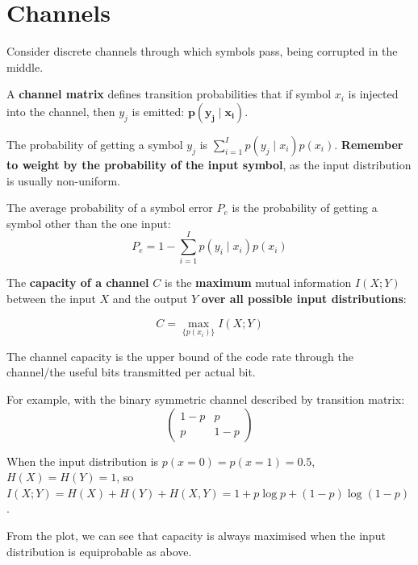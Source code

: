 \documentclass[a4paper, 11pt]{article}
\begin{document}
\section*{Channels}
{
    Consider discrete channels through which symbols pass, being corrupted in the middle.

    A \textbf{channel matrix} defines transition probabilities that if symbol \(x_i\) is injected into the channel, then \(y_j\) is emitted: \(\bm{p(y_j \mid x_i)}\).

    The probability of getting a symbol \(y_j\) is \(\displaystyle \sum_{i=1}^I{p(y_j \mid x_i)p(x_i)}\). \textbf{Remember to weight by the probability of the input symbol}, as the input distribution is usually non-uniform.

    The average probability of a symbol error \(P_e\) is the probability of getting a symbol other than the one input:
    \[P_e = 1 - \sum_{i=1}^I{p(y_i \mid x_i)p(x_i)}\]

    The \textbf{capacity of a channel} \(C\) is the \textbf{maximum} mutual information \(I(X;Y)\) between the input \(X\) and the output \(Y\) \textbf{over all possible input distributions}:

    \[C = \max_{\{p(x_i)\}}{I(X;Y)}\]

    The channel capacity is the upper bound of the code rate through the channel/the useful bits transmitted per actual bit.

    \begin{minipage}[t]{0.6\textwidth}
    For example, with the binary symmetric channel described by transition matrix:
    \[
    \begin{pmatrix}
    1 - p & p \\
    p & 1 - p
    \end{pmatrix}
    \]

    When the input distribution is \(p(x=0) = p(x=1) = 0.5\), \(H(X) = H(Y) = 1\), so \(I(X;Y) = H(X) + H(Y) + H(X,Y) = 1 + p\log p + (1-p)\log(1-p)\).

    From the plot, we can see that capacity is always maximised when the input distribution is equiprobable as above.


\end{minipage}}
\end{document}
